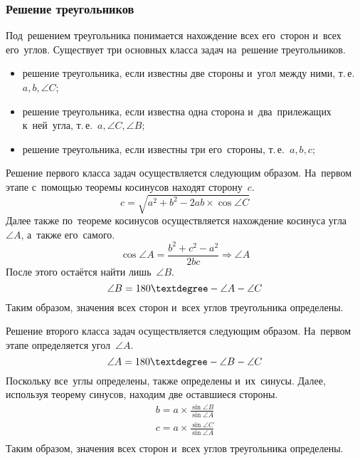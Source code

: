 \documentclass[]{scrartcl}
\begin{document}
\subsubsection{Решение треугольников}
Под~решением треугольника понимается нахождение всех его~сторон и~всех его~углов. Существует три основных класса задач на~решение треугольников.
\begin{itemize}
	\item решение треугольника, если известны две стороны и~угол между ними, т.\,е.~${\textstyle a,b,\angle C}$;
	\item решение треугольника, если известна одна сторона и~два~прилежащих к~ней~угла, т.\,е.~${\textstyle a,\angle C,\angle B}$;
	\item решение треугольника, если известны три его~стороны, т.\,е.~${\textstyle a,b,c}$;
\end{itemize}
Решение первого класса задач осуществляется следующим образом. На~первом этапе с~помощью  теоремы косинусов находят сторону~${\textstyle c}$.
\begin{equation}\label{eq:triangle-solving-1}
c=\sqrt{a^{2}+b^{2}-2ab \times \cos \angle C}
\end{equation}
Далее также по~теореме косинусов осуществляется нахождение косинуса угла~${\textstyle \angle A}$, а~также его~самого.
\begin{equation}\label{eq:triangle-solving-2}
\cos \angle A = \frac{b^2+c^2-a^2}{2bc} \Rightarrow \angle A
\end{equation}
После этого остаётся найти лишь~${\textstyle \angle B}$.
\begin{equation}\label{eq:triangle-solving-3}
\angle B = 180 \textdegree - \angle A - \angle C
\end{equation}
Таким образом, значения всех сторон и~всех углов треугольника определены.

Решение второго класса задач осуществляется следующим образом. На~первом этапе определяется угол~${\textstyle \angle A}$.
\begin{equation}\label{eq:triangle-solving-4}
\angle A = 180 \textdegree - \angle B - \angle C
\end{equation}
Поскольку все~углы определены, также определены и~их~синусы. Далее, используя теорему синусов, находим две оставшиеся стороны.
\begin{equation}\label{eq:triangle-solving-5}
\begin{aligned}
b = a \times \frac{\sin \angle B}{\sin \angle A}\\
c = a \times \frac{\sin \angle C}{\sin \angle A}\\
\end{aligned}
\end{equation}
Таким образом, значения всех сторон и~всех углов треугольника определены.
\end{document}
